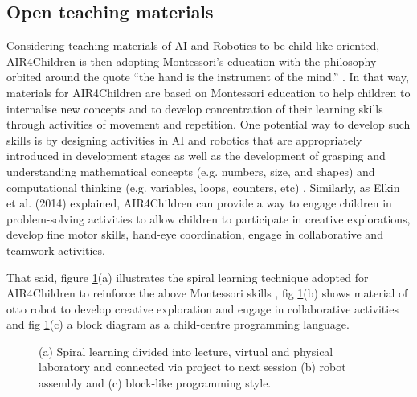 \documentclass[sigconf]{acmart}
\begin{document}
\subsection{Open teaching materials}
Considering teaching materials of AI and Robotics to be child-like oriented, AIR4Children is then adopting Montessori's education with the philosophy orbited around the quote “the hand is the instrument of the mind.” \cite{montessori2013absorbent}.
In that way, materials for AIR4Children are based on Montessori education to help children to internalise new concepts and to develop concentration of their learning skills through activities of movement and repetition.
One potential way to develop such skills is by designing activities in AI and robotics that are appropriately introduced in development stages \cite{bers2008, bers-horn2010, kazakoff-bers2012} as well as the development of grasping and understanding mathematical concepts (e.g. numbers, size, and shapes) and computational thinking (e.g. variables, loops, counters, etc) \cite{bers2012, resnick1998}.
Similarly, as Elkin et al. (2014) \cite{elkin2014} explained, AIR4Children can provide a way to engage children in problem-solving activities to allow children to participate in creative explorations, develop fine motor skills, hand-eye coordination, engage in collaborative and teamwork activities.

That said, figure \ref{fig:tm}(a) illustrates the spiral learning technique adopted for AIR4Children to reinforce the above Montessori skills \cite{tarik2017}, fig \ref{fig:tm}(b) shows material of otto robot to develop creative exploration and engage in collaborative activities and fig \ref{fig:tm}(c) a block diagram as a child-centre programming language. 

\begin{figure}[h]
  \centering
  \caption{(a) Spiral learning divided into lecture, virtual and physical laboratory and connected via project to next session \cite{tarik2017} (b) robot assembly and (c) block-like programming style.}
  \label{fig:tm}
\end{figure}
 

\end{document}
